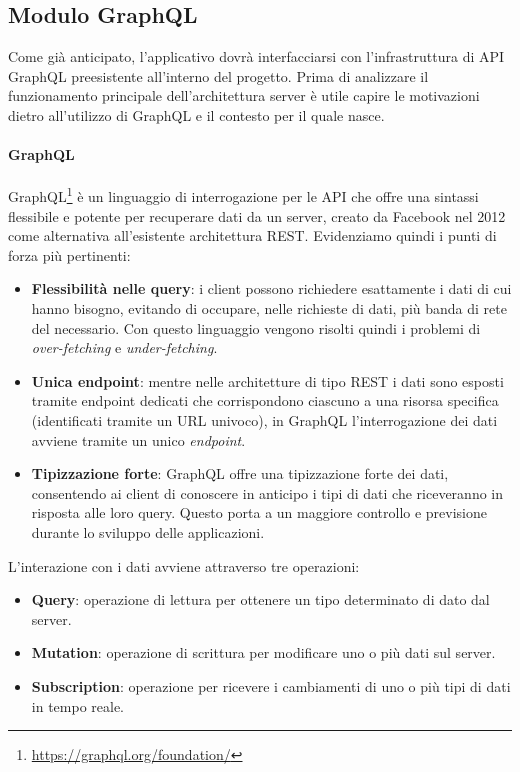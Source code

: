 \subsection{Modulo GraphQL}
Come già anticipato, l'applicativo dovrà interfacciarsi con l'infrastruttura di API GraphQL preesistente all'interno del progetto. 
Prima di analizzare il funzionamento principale dell'architettura server è utile capire le motivazioni dietro all'utilizzo di GraphQL e il contesto per il quale nasce.

\paragraph{GraphQL}
  GraphQL\footnote{\url{https://graphql.org/foundation/}} è un linguaggio di interrogazione per le \ac{API} che offre una sintassi flessibile e potente per recuperare dati da un server, creato da Facebook nel 2012 come alternativa all'esistente architettura \ac{REST}. Evidenziamo quindi i punti di forza più pertinenti:
\begin{itemize}
	\item \textbf{Flessibilità nelle query}: i client possono richiedere esattamente i dati di cui hanno bisogno, evitando di occupare, nelle richieste di dati, più banda di rete del necessario. Con questo linguaggio vengono risolti quindi i problemi di \textit{over-fetching} e \textit{under-fetching}.
	\item \textbf{Unica endpoint}:  mentre nelle architetture di tipo \ac{REST} i dati sono esposti tramite endpoint dedicati che corrispondono ciascuno a una risorsa specifica (identificati tramite un \ac{URL} univoco), in GraphQL l'interrogazione dei dati avviene tramite un unico \textit{endpoint}.
	\item \textbf{Tipizzazione forte}: GraphQL offre una tipizzazione forte dei dati, consentendo ai client di conoscere in anticipo i tipi di dati che riceveranno in risposta alle loro query. Questo porta a un maggiore controllo e previsione durante lo sviluppo delle applicazioni.
\end{itemize}
L'interazione con i dati avviene attraverso tre operazioni: 
\begin{itemize}
	\item \textbf{Query}: operazione di lettura per ottenere un tipo determinato di dato dal server.
	\item \textbf{Mutation}:  operazione di scrittura per modificare uno o più dati sul server.
	\item \textbf{Subscription}: operazione per ricevere i cambiamenti di uno o più tipi di dati in tempo reale.
\end{itemize}

